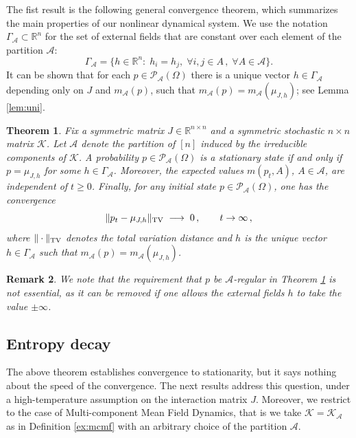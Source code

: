 \documentclass[11pt,reqno]{amsart}
\numberwithin{equation}{section}
\numberwithin{figure}{section}
\newtheorem{theorem}{Theorem}[section]
\newtheorem{remark}[theorem]{Remark}
\newcommand{\1}{\mathds{1}}
\let\G=\Gamma
\newcommand{\cA}{\ensuremath{\mathcal A}}
\newcommand{\cK}{\ensuremath{\mathcal K}}
\newcommand{\bbR}{{\ensuremath{\mathbb R}} }
\begin{document}
The fist result is the following general convergence theorem, which  summarizes the main properties of our nonlinear dynamical system.
We use the notation 
$\G_\cA\subset \bbR^n$ for the set of external fields that are constant over each element of the partition $\cA$: 
\[
\G_\cA = \{h\in\bbR^n:\; h_i=h_j,  \; \forall i,j\in A\,,\; \forall A\in\cA\}
.\]
It can be shown that for each $p\in\mathcal{P}_\cA(\Omega)$ there is a  unique vector $h\in\G_\cA$ depending only on $J$ and $m_\cA(p) $, such that  
$m_\cA(p) = m_\cA(\mu_{J,h})$; see Lemma \ref{lem:uni}. 
\begin{theorem}\label{th:basic}
Fix a symmetric matrix $J\in\bbR^{n\times n}$ and a symmetric stochastic $n\times n$ matrix $\cK$. Let $\cA$ denote the partition of $[n]$ induced by the irreducible components of $\cK$. 
 A probability $p \in \mathcal{P}_\cA(\Omega)$ is a stationary state if and only if $p=\mu_{J,h}$ for some $h\in\G_\cA$.
 Moreover, %
 the expected values
$m(p_t,A)$, $A\in \cA$,
are independent of $t\ge 0$. Finally, for any initial state $p\in \mathcal{P}_\cA(\Omega)$, one has the convergence 
\begin{equation}
\label{eq:conv}
\|p_t - \mu_{J,h}\|_{\rm TV}\; \longrightarrow \;0\,,\qquad t\to\infty\,,
\end{equation}
where $\|\cdot\|_{\rm TV}$ denotes the total variation distance and %
$h$ is the unique vector $h\in\G_\cA$ such that %
$m_\cA(p) = m_\cA(\mu_{J,h})$. 
\end{theorem}
\begin{remark}\label{rem:hinfinity}
We note that the requirement that $p$ be $\cA$-regular in Theorem \ref{th:basic} is not essential, as it can be removed if one allows the external fields $h$ to take the value $\pm\infty$. 
\end{remark}
\subsection{Entropy decay}
The above theorem establishes convergence to stationarity, but it says nothing about the speed of the convergence. The next results address this question, under a high-temperature assumption on the interaction matrix $J$. Moreover,  we restrict to the case of Multi-component  Mean Field Dynamics, that is we take  $\cK=\cK_\cA$ as in Definition \ref{ex:mcmf} with an arbitrary choice of the partition $\cA$.
\end{document}
